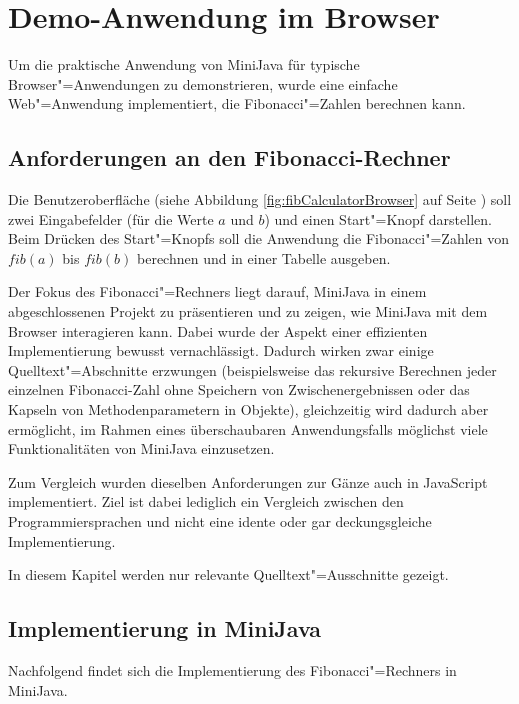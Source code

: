 \chapter{Demo-Anwendung im Browser}
\label{cha:DemoAnwendung}

Um die praktische Anwendung von MiniJava für typische Browser"=Anwendungen zu demonstrieren, wurde eine einfache Web"=Anwendung implementiert, die Fibonacci"=Zahlen berechnen kann.

\section{Anforderungen an den Fibonacci-Rechner}
Die Benutzeroberfläche (siehe Abbildung \ref{fig:fibCalculatorBrowser} auf Seite \pageref{fig:fibCalculatorBrowser}) soll zwei Eingabefelder (für die Werte $a$ und $b$) und einen Start"=Knopf darstellen. Beim Drücken des Start"=Knopfs soll die Anwendung die Fibonacci"=Zahlen von $fib(a)$ bis $fib(b)$ berechnen und in einer Tabelle ausgeben.

Der Fokus des Fibonacci"=Rechners liegt darauf, MiniJava in einem abgeschlossenen Projekt zu präsentieren und zu zeigen, wie MiniJava mit dem Browser interagieren kann. Dabei wurde der Aspekt einer effizienten Implementierung bewusst vernachlässigt. Dadurch wirken zwar einige Quelltext"=Abschnitte erzwungen (beispielsweise das rekursive Berechnen jeder einzelnen Fibonacci-Zahl ohne Speichern von Zwischenergebnissen oder das Kapseln von Methodenparametern in Objekte), gleichzeitig wird dadurch aber ermöglicht, im Rahmen eines überschaubaren Anwendungsfalls möglichst viele Funktionalitäten von MiniJava einzusetzen.

Zum Vergleich wurden dieselben Anforderungen zur Gänze auch in JavaScript implementiert. Ziel ist dabei lediglich ein Vergleich zwischen den Programmiersprachen und nicht eine idente oder gar deckungsgleiche Implementierung.

In diesem Kapitel werden nur relevante Quelltext"=Ausschnitte gezeigt.

\pagebreak
\section{Implementierung in MiniJava}

Nachfolgend findet sich die Implementierung des Fibonacci"=Rechners in MiniJava.

\pagebreak



